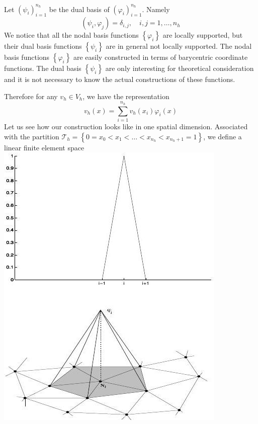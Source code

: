 \documentclass[10pt]{article}
\begin{document}
Let $\left(\psi_{i}\right)_{i=1}^{n_{h}}$ be the dual basis of $\left(\varphi_{i}\right)_{i=1}^{n_{h}} .$ Namely
$$
\left(\psi_{i}, \varphi_{j}\right)=\delta_{i, j}, \quad i, j=1, \ldots, n_{h}
$$
We notice that all the nodal basis functions $\left\{\varphi_{i}\right\}$ are locally supported, but their dual basis functions $\left\{\psi_{i}\right\}$ are in general not locally supported. The nodal basis functions $\left\{\varphi_{i}\right\}$ are easily constructed in terms of barycentric coordinate functions. The dual basis $\left\{\psi_{i}\right\}$ are only interesting for theoretical consideration and it is not necessary to know the actual constructions of these functions.

Therefore for any $v_{h} \in V_{h}$, we have the representation
$$
v_{h}(x)=\sum_{i=1}^{n_{h}} v_{h}\left(x_{i}\right) \varphi_{i}(x)
$$
Let us see how our construction looks like in one spatial dimension. Associated with the partition $\mathcal{T}_{h}=\left\{0=x_{0}<x_{1}<\ldots<x_{n_{h}}<x_{n_{h}+1}=1\right\}$, we define a linear finite element space\\

\includegraphics[max width=\textwidth]{2022_01_05_15c63bf4a948497c30d9g-09}
\end{document}
